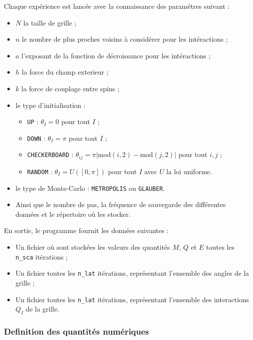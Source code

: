 \documentclass[a4paper, 11pt]{article}
\begin{document}
Chaque expérience est lancée avec la connaissance des paramêtres suivant :
\begin{itemize}
    \item $N$ la taille de grille ;
    \item $n$ le nombre de plus proches voisins à considérer pour les intéractions ;
    \item $a$ l'exposant de la fonction de décroissance pour les intéractions ;
    \item $h$ la force du champ exterieur ;
    \item $k$ la force de couplage entre spins ;
    \item le type d'initialisation :
        \begin{itemize}
            \item \texttt{UP} : $\theta_{I}=0$ pour tout $I$ ;
            \item \texttt{DOWN} : $\theta_{I}=\pi$ pour tout $I$ ;
            \item \texttt{CHECKERBOARD} : $\theta_{ij}=\pi |\mathrm{mod}(i,2)-\mathrm{mod}(j, 2)|$ pour tout $i, j$ ;
            \item \texttt{RANDOM} : $\theta_{I}= U([0, \pi])$ pour tout $I$ avec $U$ la loi
                uniforme. 
        \end{itemize}
    \item le type de Monte-Carlo : \texttt{METROPOLIS}  ou \texttt{GLAUBER}.
    \item Ainsi que le nombre de pas, la fréquence de sauvegarde des différentes données et le
        répertoire où les stocker.
\end{itemize}
En sortie, le programme fournit les données suivantes :
\begin{itemize}
    \item Un fichier où sont stockées les valeurs des quantités $M$, $Q$ et $E$ toutes les
        \texttt{n\_sca} itérations ; 
    \item Un fichier toutes les \texttt{n\_lat} itérations, représentant l'ensemble des angles de la
        grille ; 
    \item Un fichier toutes les \texttt{n\_lat} itérations, représentant l'ensemble des interactions
        $Q_I$ de la grille.
\end{itemize}

\subsubsection{Definition des quantités numériques}
\end{document}
